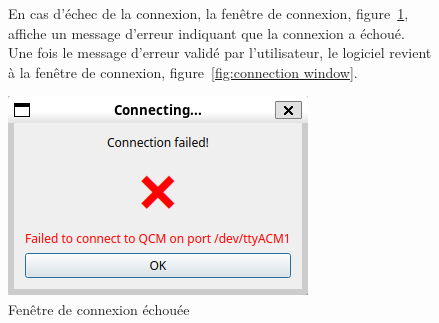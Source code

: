 \begin{figure}[H]
    \begin{minipage}{0.64\textwidth}
        En cas d’échec de la connexion, la fenêtre de connexion, figure~\ref{fig:connection fail}, affiche un message d'erreur indiquant que la connexion a échoué.
        Une fois le message d'erreur validé par l'utilisateur, le logiciel revient à la fenêtre de connexion, figure~\ref{fig:connection window}.
    \end{minipage}\hfill
    \begin{minipage}{0.30\textwidth}
        \centering
        \includegraphics[width=\textwidth]{assets/figures/ConnectionFail.png}
        \caption{Fenêtre de connexion échouée}
        \label{fig:connection fail}
    \end{minipage}
\end{figure}

